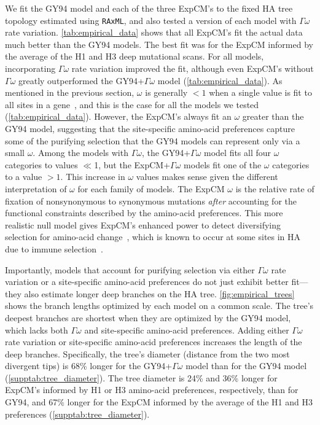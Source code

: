 \documentclass[11pt]{article}
\begin{document}
We fit the GY94 model and each of the three ExpCM's to the fixed HA tree topology estimated using \texttt{RAxML}, and also tested a version of each model with $\Gamma\omega$ rate variation.
\ref{tab:empirical_data} shows that all ExpCM's fit the actual data much better than the GY94 models.
The best fit was for the ExpCM informed by the average of the H1 and H3 deep mutational scans.
For all models, incorporating $\Gamma\omega$ rate variation improved the fit, although even ExpCM's without $\Gamma\omega$ greatly outperformed the GY94+$\Gamma\omega$ model (\ref{tab:empirical_data}).
As mentioned in the previous section, $\omega$ is generally $<1$ when a single value is fit to all sites in a gene~\citep{murrell2015gene}, and this is the case for all the models we tested (\ref{tab:empirical_data}).
However, the ExpCM's always fit an $\omega$ greater than the GY94 model, suggesting that the site-specific amino-acid preferences capture some of the purifying selection that the GY94 models can represent only via a small $\omega$.
Among the models with $\Gamma\omega$, the GY94+$\Gamma\omega$ model fits all four $\omega$ categories to values $\ll$1, but the ExpCM+$\Gamma\omega$ models fit one of the $\omega$ categories to a value $>1$.
This increase in $\omega$ values makes sense given the different interpretation of $\omega$ for each family of models. 
The ExpCM $\omega$ is the relative rate of fixation of nonsynonymous to synonymous mutations \textit{after} accounting for the functional constraints described by the amino-acid preferences.
This more realistic null model gives ExpCM's enhanced power to detect diversifying selection for amino-acid change~\citep{bloom2017identification, rodrigue2017detecting}, which is known to occur at some sites in HA due to immune selection~\citep{bedford2014integrating}.

Importantly, models that account for purifying selection via either $\Gamma\omega$ rate variation or a site-specific amino-acid preferences do not just exhibit better fit---they also estimate longer deep branches on the HA tree. 
\ref{fig:empirical_trees} shows the branch lengths optimized by each model on a common scale.
The tree's deepest branches are shortest when they are optimized by the GY94 model, which lacks both $\Gamma\omega$ and site-specific amino-acid preferences.
Adding either $\Gamma\omega$ rate variation or site-specific amino-acid preferences increases the length of the deep branches.
Specifically, the tree's diameter (distance from the two most divergent tips) is 68\% longer for the GY94+$\Gamma\omega$ model than for the GY94 model (\ref{supptab:tree_diameter}).
The tree diameter is 24\% and 36\% longer for ExpCM's informed by H1 or H3 amino-acid preferences, respectively, than for GY94, and 67\% longer for the ExpCM informed by the average of the H1 and H3 preferences (\ref{supptab:tree_diameter}).
\end{document}
